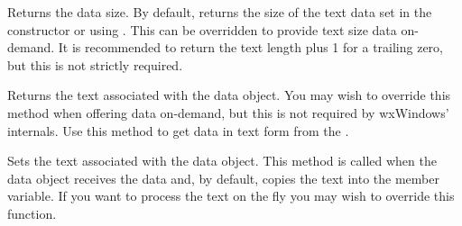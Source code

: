 \label{wxtextdataobjectgettextlength}


Returns the data size. By default, returns the size of the text data
set in the constructor or using .
This can be overridden to provide text size data on-demand. It is recommended
to return the text length plus 1 for a trailing zero, but this is not
strictly required.

\label{wxtextdataobjectgettext}


Returns the text associated with the data object. You may wish to override
this method when offering data on-demand, but this is not required by
wxWindows' internals. Use this method to get data in text form from
the .

\label{wxtextdataobjectsettext}


Sets the text associated with the data object. This method is called
when the data object receives the data and, by default, copies the text into
the member variable. If you want to process the text on the fly you may wish to
override this function.

